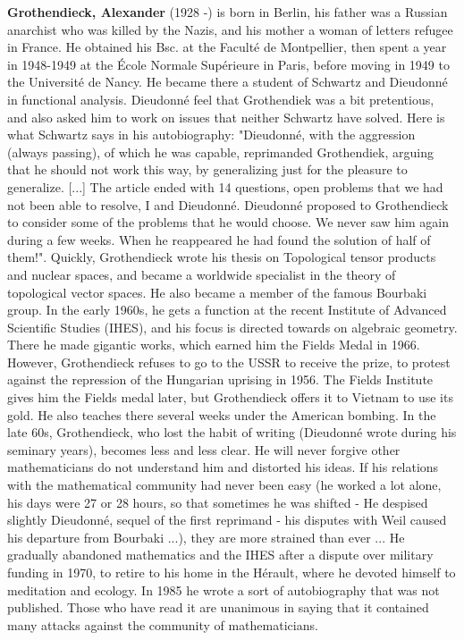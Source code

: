 \textbf{Grothendieck, Alexander} (1928 -) is born in Berlin, his father was a Russian anarchist who was killed by the Nazis, and his mother a woman of letters refugee in France. He obtained his Bsc. at the Faculté de Montpellier, then spent a year in 1948-1949 at the École Normale Supérieure in Paris, before moving in 1949 to the Université de Nancy. He became there a student of Schwartz and Dieudonné in functional analysis. Dieudonné feel that Grothendiek was a bit pretentious, and also asked him to work on issues that neither Schwartz have solved. Here is what Schwartz says in his autobiography: "Dieudonné, with the aggression (always passing), of which he was capable, reprimanded Grothendiek, arguing that he should not work this way, by generalizing just for the pleasure to generalize. [...] The article ended with 14 questions, open problems that we had not been able to resolve, I and Dieudonné. Dieudonné proposed to Grothendieck to consider some of the problems that he would choose. We never saw him again during a few weeks. When he reappeared he had found the solution of half of them!". Quickly, Grothendieck wrote his thesis on Topological tensor products and nuclear spaces, and became a worldwide specialist in the theory of topological vector spaces. He also became a member of the famous Bourbaki group. In the early 1960s, he gets a function at the recent Institute of Advanced Scientific Studies (IHES), and his focus is directed towards on algebraic geometry. There he made gigantic works, which earned him the Fields Medal in 1966. However, Grothendieck refuses to go to the USSR to receive the prize, to protest against the repression of the Hungarian uprising in 1956. The Fields Institute gives him the Fields medal later, but Grothendieck offers it to Vietnam to use its gold. He also teaches there several weeks under the American bombing. In the late 60s, Grothendieck, who lost the habit of writing (Dieudonné wrote during his seminary years), becomes less and less clear. He will never forgive other mathematicians do not understand him and distorted his ideas. If his relations with the mathematical community had never been easy (he worked a lot alone, his days were 27 or 28 hours, so that sometimes he was shifted - He despised slightly Dieudonné, sequel of the first reprimand - his disputes with Weil caused his departure from Bourbaki ...), they are more strained than ever ... He gradually abandoned mathematics and the IHES after a dispute over military funding in 1970, to retire to his home in the Hérault, where he devoted himself to meditation and ecology. In 1985 he wrote a sort of autobiography that was not published. Those who have read it are unanimous in saying that it contained many attacks against the community of mathematicians.

